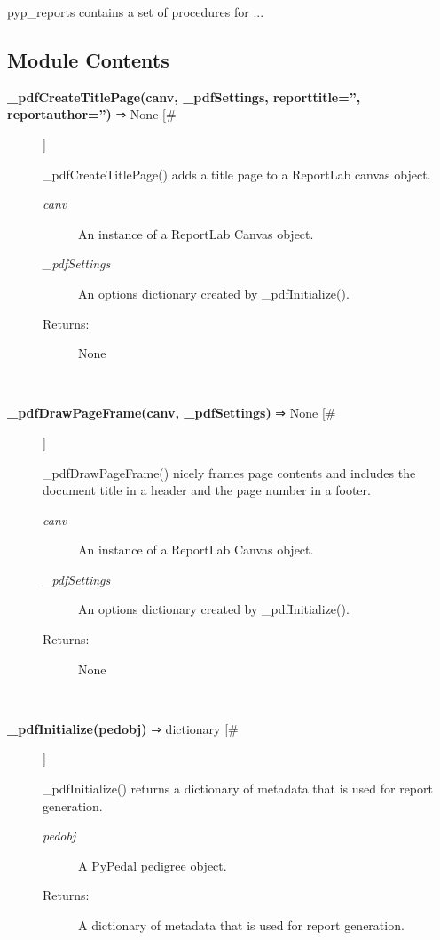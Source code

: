 \par pyp\_reports contains a set of procedures for ...
\subsection*{Module Contents}
\begin{description}
\item[\textbf{\_pdfCreateTitlePage(canv, \_pdfSettings, reporttitle='', reportauthor='')} ⇒ None [\#]
]
\par \_pdfCreateTitlePage() adds a title page to a ReportLab canvas object.
\begin{description}
\item[\textit{canv}
]
An instance of a ReportLab Canvas object.
\item[\textit{\_pdfSettings}
]
An options dictionary created by \_pdfInitialize().
\item[Returns:
]
None
\end{description}\\

\item[\textbf{\_pdfDrawPageFrame(canv, \_pdfSettings)} ⇒ None [\#]
]
\par \_pdfDrawPageFrame() nicely frames page contents and includes the
document title in a header and the page number in a footer.
\begin{description}
\item[\textit{canv}
]
An instance of a ReportLab Canvas object.
\item[\textit{\_pdfSettings}
]
An options dictionary created by \_pdfInitialize().
\item[Returns:
]
None
\end{description}\\

\item[\textbf{\_pdfInitialize(pedobj)} ⇒ dictionary [\#]
]
\par \_pdfInitialize() returns a dictionary of metadata that is used for report
generation.
\begin{description}
\item[\textit{pedobj}
]
A PyPedal pedigree object.
\item[Returns:
]
A dictionary of metadata that is used for report generation.
\end{description}\\


\end{description}
